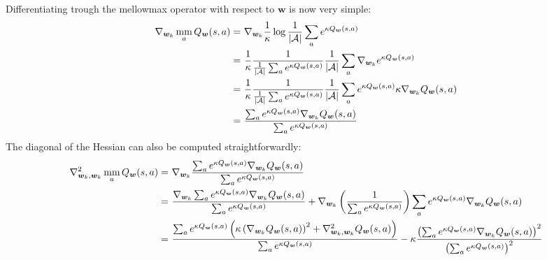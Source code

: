 \documentclass{article}
\newcommand{\mm}{\operatornamewithlimits{mm}}
\begin{document}
Differentiating trough the mellowmax operator with respect to $\bm{w}$ is now very simple:
\begin{align}
\nabla_{\bm{w}_k}\mm_a Q_{\bm{w}}(s,a) =\ & 
\nabla_{\bm{w}_k} \frac{1}{\kappa} \log \frac{1}{|\mathcal{A}|}\sum_a e^{\kappa Q_{\bm{w}}(s,a)} \\ =\ &
\frac{1}{\kappa}\frac{1}{\frac{1}{|\mathcal{A}|}\sum_a e^{\kappa Q_{\bm{w}}(s,a)}}\frac{1}{|\mathcal{A}|}\sum_a \nabla_{\bm{w}_k} e^{\kappa Q_{\bm{w}}(s,a)} \\ =\ &
\frac{1}{\kappa}\frac{1}{\frac{1}{|\mathcal{A}|}\sum_a e^{\kappa Q_{\bm{w}}(s,a)}}\frac{1}{|\mathcal{A}|}\sum_a e^{\kappa Q_{\bm{w}}(s,a)} \kappa \nabla_{\bm{w}_k} Q_{\bm{w}}(s,a) \\ =\ &
\frac{\sum_a e^{\kappa Q_{\bm{w}}(s,a)} \nabla_{\bm{w}_k} Q_{\bm{w}}(s,a)}{\sum_a e^{\kappa Q_{\bm{w}}(s,a)}}
\end{align}
The diagonal of the Hessian can also be computed straightforwardly:
\begin{align}
\nabla_{\bm{w}_k,\bm{w}_k}^2 \mm_a Q_{\bm{w}}(s,a) =\ &
\nabla_{\bm{w}_k}\frac{\sum_a e^{\kappa Q_{\bm{w}}(s,a)} \nabla_{\bm{w}_k} Q_{\bm{w}}(s,a)}{\sum_a e^{\kappa Q_{\bm{w}}(s,a)}} \\ =\ &
\frac{\nabla_{\bm{w}_k}\sum_a e^{\kappa Q_{\bm{w}}(s,a)} \nabla_{\bm{w}_k} Q_{\bm{w}}(s,a)}{\sum_a e^{\kappa Q_{\bm{w}}(s,a)}} + \nabla_{\bm{w}_k}\left( \frac{1}{\sum_a e^{\kappa Q_{\bm{w}}(s,a)}} \right)\sum_a e^{\kappa Q_{\bm{w}}(s,a)} \nabla_{\bm{w}_k} Q_{\bm{w}}(s,a) \\ =\ &
\frac{\sum_a e^{\kappa Q_{\bm{w}}(s,a)}\left( \kappa \left(\nabla_{\bm{w}_k} Q_{\bm{w}}(s,a)\right)^2 + \nabla_{\bm{w}_k,\bm{w}_k}^2 Q_{\bm{w}}(s,a)\right)}{\sum_a e^{\kappa Q_{\bm{w}}(s,a)}} - \kappa\frac{\left(\sum_a e^{\kappa Q_{\bm{w}}(s,a)} \nabla_{\bm{w}_k} Q_{\bm{w}}(s,a)\right)^2}{\left(\sum_a e^{\kappa Q_{\bm{w}}(s,a)}\right)^2}
\end{align}
\end{document}
